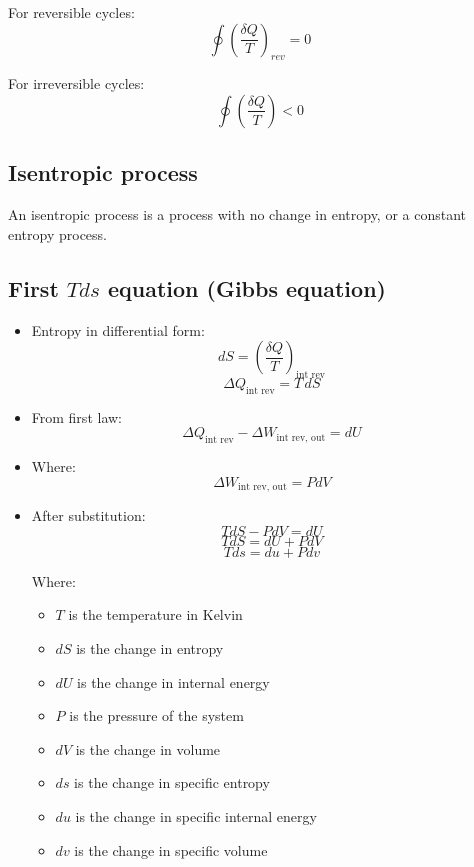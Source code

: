 \documentclass[11pt]{article}
\begin{document}
For reversible cycles:
\[\oint \left(\frac{\delta Q}{T} \right)_{rev} = 0\]

For irreversible cycles:
\[\oint \left(\frac{\delta Q}{T} \right) < 0\]

\subsection{Isentropic process}
\label{sec:org78b03a3}
An isentropic process is a process with no change in entropy, or a constant entropy process.

 \newpage

\subsection{First \(T ds\) equation (Gibbs equation)}
\label{sec:org6cb6793}
\begin{itemize}
\item Entropy in differential form:
\[dS = \left(\frac{\delta Q}{T} \right)_{\text{int rev}}\]
\[\Delta Q_{\text{int rev}} = T \, dS\]
\item From first law:
\[\Delta Q_{\text{int rev}} - \Delta W_{\text{int rev, out}} = dU\]
\item Where:
\[\Delta W_{\text{int rev, out}} = P dV\]
\item After substitution:
\[T dS - P dV = dU\]
\[TdS = dU + P dV\]
\[Tds = du + P dv\]

Where:
\begin{itemize}
\item \(T\) is the temperature in Kelvin
\item \(dS\) is the change in entropy
\item \(dU\) is the change in internal energy
\item \(P\) is the pressure of the system
\item \(dV\) is the change in volume
\item \(ds\) is the change in specific entropy
\item \(du\) is the change in specific internal energy
\item \(dv\) is the change in specific volume
\end{itemize}
\end{itemize}

 \newpage
\end{document}
